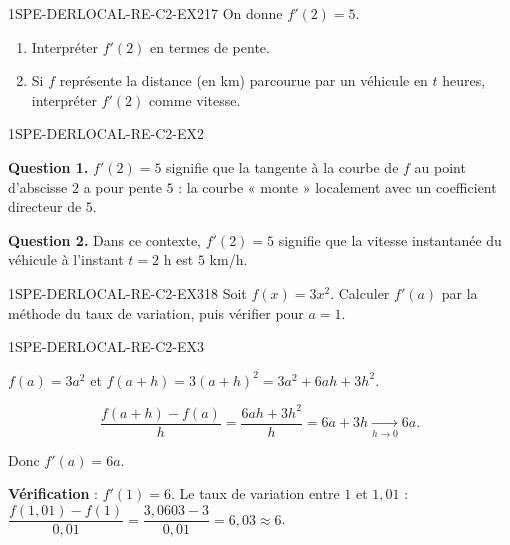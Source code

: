 \begin{exercice}{1SPE-DERLOCAL-RE-C2-EX2}{1}{7}
On donne $f'(2) = 5$.
\begin{enumerate}
  \item Interpréter $f'(2)$ en termes de pente.
  \item Si $f$ représente la distance (en km) parcourue par un véhicule en $t$ heures, interpréter $f'(2)$ comme vitesse.
\end{enumerate}
\end{exercice}

\begin{corrige}{1SPE-DERLOCAL-RE-C2-EX2}

\textbf{Question 1.}
$f'(2) = 5$ signifie que la tangente à la courbe de $f$ au point d'abscisse $2$ a pour pente $5$ : la courbe « monte » localement avec un coefficient directeur de $5$.

\textbf{Question 2.}
Dans ce contexte, $f'(2) = 5$ signifie que la vitesse instantanée du véhicule à l'instant $t=2$ h est $5$ km/h.

\end{corrige}


\begin{exercice}{1SPE-DERLOCAL-RE-C2-EX3}{1}{8}
Soit $f(x) = 3x^2$. Calculer $f'(a)$ par la méthode du taux de variation, puis vérifier pour $a=1$.
\end{exercice}


\begin{corrige}{1SPE-DERLOCAL-RE-C2-EX3}

$f(a) = 3a^2$ et $f(a+h) = 3(a+h)^2 = 3a^2 + 6ah + 3h^2$.

\[
\frac{f(a+h)-f(a)}{h} = \frac{6ah + 3h^2}{h} = 6a + 3h \xrightarrow[h \to 0]{} 6a.
\]

Donc $f'(a) = 6a$.

\textbf{Vérification} : $f'(1) = 6$. Le taux de variation entre $1$ et $1{,}01$ :
$\dfrac{f(1{,}01)-f(1)}{0{,}01} = \dfrac{3{,}0603 - 3}{0{,}01} = 6{,}03 \approx 6$. \checkmark

\end{corrige}
